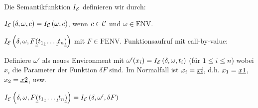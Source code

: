 \begin{defn}\label{defn:semexp}
Die Semantikfunktion $I_{\mathcal{E}}$ definieren wir durch:
\begin{\whichenum}
\item $I_{\mathcal{E}}\left(\delta,\omega,c\right) = I_{\mathcal{C}}\left(\omega,c\right)$, wenn $c \in \mathcal{C}$ und $\omega \in \text{ENV}$.
\item $I_{\mathcal{E}}\left(\delta,\omega,F\underline{(}t_1\underline{,}\ldots\underline{,}t_n\underline{)}\right)$ mit $F \in \text{FENV}$. Funktionsaufruf mit call-by-value:
\begin{\whichenum}
\item Definiere $\omega'$ als neues Environment mit $\omega'(x_i)=I_{\mathcal{E}}\left(\delta,\omega,t_i\right)$ (für $1 \leq i \leq n$) wobei $x_i$
die Parameter der Funktion $\delta F$ sind. Im Normalfall ist $x_i=\underline{xi}$, d.h. $x_1=\underline{x1}$, $x_2=\underline{x2}$, usw.
\item $I_{\mathcal{E}}\left(\delta,\omega,F\underline{(}t_1\underline{,}\ldots\underline{,}t_n\underline{)}\right)=I_{\mathcal{E}}\left(\delta,\omega',\delta F\right)$
\end{\whichenum}
\end{\whichenum}
\end{defn}

